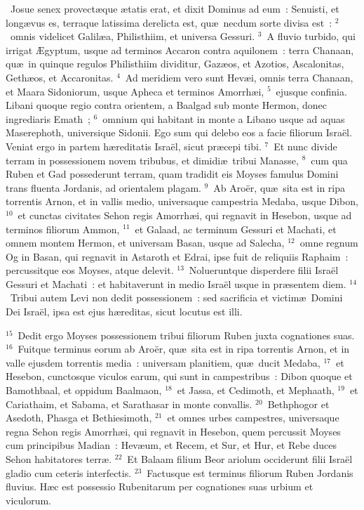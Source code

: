 ~\lettrine[lines=10,image=true,loversize=0.05,lraise=-0.03]{J}{}osue senex provect\ae que \ae tatis erat, et dixit Dominus ad eum~: Senuisti, et long\ae vus es, terraque latissima derelicta est, qu\ae\ necdum sorte divisa est~:
${}^{2}$~omnis videlicet Galil\ae a, Philisthiim, et universa Gessuri.
${}^{3}$~A fluvio turbido, qui irrigat \AE gyptum, usque ad terminos Accaron contra aquilonem~: terra Chanaan, qu\ae\ in quinque regulos Philisthiim dividitur, Gaz\ae os, et Azotios, Ascalonitas, Geth\ae os, et Accaronitas.
${}^{4}$~Ad meridiem vero sunt Hev\ae i, omnis terra Chanaan, et Maara Sidoniorum, usque Apheca et terminos Amorrh\ae i,
${}^{5}$~ejusque confinia. Libani quoque regio contra orientem, a Baalgad sub monte Hermon, donec ingrediaris Emath~;
${}^{6}$~omnium qui habitant in monte a Libano usque ad aquas Maserephoth, universique Sidonii. Ego sum qui delebo eos a facie filiorum Isra\"el. Veniat ergo in partem h\ae reditatis Isra\"el, sicut pr\ae cepi tibi.
${}^{7}$~Et nunc divide terram in possessionem novem tribubus, et dimidi\ae\ tribui Manasse,
${}^{8}$~cum qua Ruben et Gad possederunt terram, quam tradidit eis Moyses famulus Domini trans fluenta Jordanis, ad orientalem plagam.
${}^{9}$~Ab Aro\"er, qu\ae\ sita est in ripa torrentis Arnon, et in vallis medio, universaque campestria Medaba, usque Dibon,
${}^{10}$~et cunctas civitates Sehon regis Amorrh\ae i, qui regnavit in Hesebon, usque ad terminos filiorum Ammon,
${}^{11}$~et Galaad, ac terminum Gessuri et Machati, et omnem montem Hermon, et universam Basan, usque ad Salecha,
${}^{12}$~omne regnum Og in Basan, qui regnavit in Astaroth et Edrai, ipse fuit de reliquiis Raphaim~: percussitque eos Moyses, atque delevit.
${}^{13}$~Nolueruntque disperdere filii Isra\"el Gessuri et Machati~: et habitaverunt in medio Isra\"el usque in pr\ae sentem diem.
${}^{14}$~Tribui autem Levi non dedit possessionem~: sed sacrificia et victim\ae\ Domini Dei Isra\"el, ipsa est ejus h\ae reditas, sicut locutus est illi.


${}^{15}$~Dedit ergo Moyses possessionem tribui filiorum Ruben juxta cognationes suas.
${}^{16}$~Fuitque terminus eorum ab Aro\"er, qu\ae\ sita est in ripa torrentis Arnon, et in valle ejusdem torrentis media~: universam planitiem, qu\ae\ ducit Medaba,
${}^{17}$~et Hesebon, cunctosque viculos earum, qui sunt in campestribus~: Dibon quoque et Bamothbaal, et oppidum Baalmaon,
${}^{18}$~et Jassa, et Cedimoth, et Mephaath,
${}^{19}$~et Cariathaim, et Sabama, et Sarathasar in monte convallis.
${}^{20}$~Bethphogor et Asedoth, Phasga et Bethiesimoth,
${}^{21}$~et omnes urbes campestres, universaque regna Sehon regis Amorrh\ae i, qui regnavit in Hesebon, quem percussit Moyses cum principibus Madian~: Hev\ae um, et Recem, et Sur, et Hur, et Rebe duces Sehon habitatores terr\ae .
${}^{22}$~Et Balaam filium Beor ariolum occiderunt filii Isra\"el gladio cum ceteris interfectis.
${}^{23}$~Factusque est terminus filiorum Ruben Jordanis fluvius. H\ae c est possessio Rubenitarum per cognationes suas urbium et viculorum.


